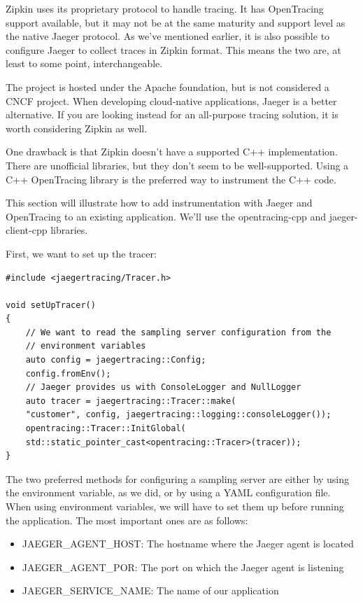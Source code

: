 Zipkin uses its proprietary protocol to handle tracing. It has OpenTracing support available, but it may not be at the same maturity and support level as the native Jaeger protocol. As we've mentioned earlier, it is also possible to configure Jaeger to collect traces in Zipkin format. This means the two are, at least to some point, interchangeable.

The project is hosted under the Apache foundation, but is not considered a CNCF project. When developing cloud-native applications, Jaeger is a better alternative. If you are looking instead for an all-purpose tracing solution, it is worth considering Zipkin as well.

One drawback is that Zipkin doesn't have a supported C++ implementation. There are unofficial libraries, but they don't seem to be well-supported. Using a C++ OpenTracing library is the preferred way to instrument the C++ code.


This section will illustrate how to add instrumentation with Jaeger and OpenTracing to an existing application. We'll use the opentracing-cpp and jaeger-client-cpp libraries.

First, we want to set up the tracer:

\begin{lstlisting}[style=styleCXX]
#include <jaegertracing/Tracer.h>

void setUpTracer()
{
	// We want to read the sampling server configuration from the
	// environment variables
	auto config = jaegertracing::Config;
	config.fromEnv();
	// Jaeger provides us with ConsoleLogger and NullLogger
	auto tracer = jaegertracing::Tracer::make(
	"customer", config, jaegertracing::logging::consoleLogger());
	opentracing::Tracer::InitGlobal(
	std::static_pointer_cast<opentracing::Tracer>(tracer));
}
\end{lstlisting}

The two preferred methods for configuring a sampling server are either by using the environment variable, as we did, or by using a YAML configuration file. When using environment variables, we will have to set them up before running the application. The most important ones are as follows:

\begin{itemize}
\item 
JAEGER\_AGENT\_HOST: The hostname where the Jaeger agent is located

\item 
JAEGER\_AGENT\_POR: The port on which the Jaeger agent is listening

\item 
JAEGER\_SERVICE\_NAME: The name of our application
\end{itemize}

